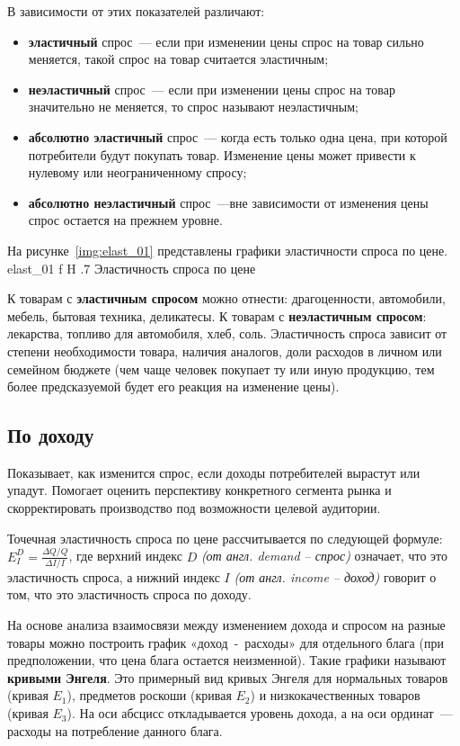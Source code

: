 В зависимости от этих показателей различают:
\begin{itemize}
	\item \textbf{эластичный }спрос~--- если при изменении цены спрос на товар сильно меняется, такой спрос на товар считается эластичным;
	\item \textbf{неэластичный }спрос~--- если при изменении цены спрос на товар значительно не меняется, то спрос называют неэластичным;
	\item \textbf{абсолютно эластичный} спрос~--- когда есть только одна цена, при которой потребители будут покупать товар. 
	Изменение цены может привести к нулевому или неограниченному спросу;
	\item \textbf{абсолютно неэластичный} спрос~---вне зависимости от изменения цены спрос остается на прежнем уровне. 
\end{itemize}

На рисунке~\ref{img:elast_01} представлены графики эластичности спроса по цене.
{elast_01}
{f}
{H}
{.7\textwidth}
{Эластичность спроса по цене~\cite{elast1}}

К товарам с \textbf{эластичным спросом} можно отнести: драгоценности, автомобили, мебель, бытовая техника, деликатесы. 
К товарам с \textbf{неэластичным спросом}: лекарства, топливо для автомобиля, хлеб, соль. 
Эластичность спроса зависит от степени необходимости товара, наличия аналогов, доли расходов в личном или семейном бюджете (чем чаще человек покупает ту или иную продукцию, тем более предсказуемой будет его реакция на изменение цены).


\subsection{По доходу}
Показывает, как изменится спрос, если доходы потребителей вырастут или упадут. 
Помогает оценить перспективу конкретного сегмента рынка и скорректировать производство под возможности целевой аудитории.

Точечная эластичность спроса по цене рассчитывается по следующей формуле: $E_{I}^{D}=\frac{\Delta Q/Q}{\Delta I/I}$,
где верхний индекс $D$ \textit{(от англ. demand -- спрос)} означает, что это эластичность спроса, а нижний индекс $I$ \textit{(от англ. income -- доход)} говорит о том, что это эластичность спроса по доходу.

На основе анализа взаимосвязи между изменением дохода и спросом на разные товары можно построить график «доход~-~расходы» для отдельного блага (при предположении, что цена блага остается неизменной). 
Такие графики называют \textbf{кривыми Энгеля}. 
Это примерный вид кривых Энгеля для нормальных товаров (кривая $E_{1}$), предметов роскоши (кривая $E_{2}$) и низкокачественных товаров (кривая $E_{3}$). 
На оси абсцисс откладывается уровень дохода, а на оси ординат~--- расходы на потребление данного блага. 

